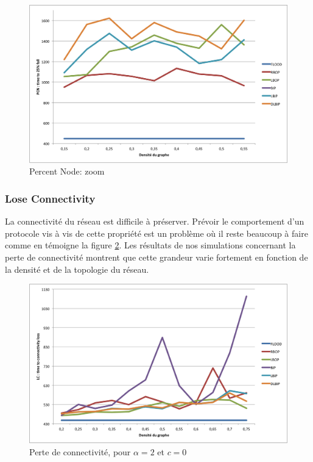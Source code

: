\begin{figure}[H]
\begin{bigcenter}
\includegraphics[scale=0.75]{Simus/pcn_2_0_zoom}
\caption{Percent Node: zoom}
\label{PCN1bis}
\end{bigcenter}
\end{figure}


\subsubsection{Lose Connectivity}

La connectivité du réseau est difficile à préserver. Prévoir le comportement d'un protocole vis à vis de cette propriété est un problème où il reste beaucoup à faire comme en témoigne la figure \ref{LC1}. Les résultats de nos simulations
concernant la perte de connectivité montrent que cette grandeur varie fortement en fonction de la densité et de la topologie du réseau. 

\begin{figure}[H]
\begin{bigcenter}
\includegraphics[scale=0.75]{Simus/lc_2_0}
\caption{Perte de connectivité, pour $\alpha = 2$ et $c = 0$}
\label{LC1}
\end{bigcenter}
\end{figure}



